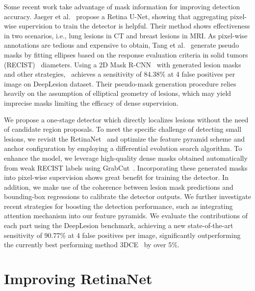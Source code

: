 \documentclass[runningheads,a4paper]{llncs}
\begin{document}
Some recent work take advantage of mask information for improving detection accuracy.
Jaeger et al.~\cite{jaeger2018retina} propose a Retina U-Net, showing that aggregating pixel-wise supervision to train the detector is helpful. Their method shows effectiveness in two scenarios, i.e., lung lesions in CT and breast lesions in MRI.
As pixel-wise annotations are tedious and expensive to obtain, Tang et al.~\cite{tang2019uldor} generate pseudo masks by fitting ellipses based on the response evaluation criteria in solid tumors (RECIST)~\cite{eisenhauer2009new} diameters.
Using a 2D Mask R-CNN~\cite{he2017mask} with generated lesion masks and other strategies,~\cite{tang2019uldor} achieves a sensitivity of 84.38\% at 4 false positives per image on DeepLesion dataset. Their pseudo-mask generation procedure relies heavily on the assumption of elliptical geometry of lesions, which may yield imprecise masks limiting the efficacy of dense supervision.


We propose a one-stage detector which directly localizes lesions without the need of candidate region proposals. To meet the specific challenge of detecting small lesions, we revisit the RetinaNet~\cite{lin2017focal} and optimize the feature pyramid scheme and anchor configuration by employing a differential evolution search algorithm. To enhance the model, we leverage high-quality dense masks obtained automatically from weak RECIST labels using GrabCut~\cite{rother2004grabcut}. Incorporating these generated masks into pixel-wise supervision shows great benefit for training the detector. In addition, we make use of the coherence between lesion mask predictions and bounding-box regressions to calibrate the detector outputs.
We further investigate recent strategies for boosting the detection performance, such as integrating attention mechanism into our feature pyramids. We evaluate the contributions of each part using the DeepLesion benchmark, achieving a new state-of-the-art sensitivity of 90.77\% at 4 false positives per image, significantly outperforming the currently best performing method 3DCE~\cite{yan20183dce} by over 5\%.

 \section{Improving RetinaNet}
\label{sec:method}
\end{document}
